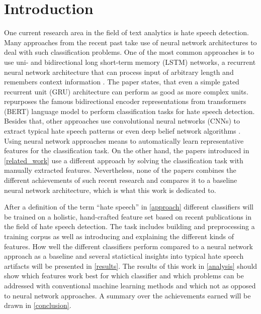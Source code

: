 \section{Introduction}

One current research area in the field of text analytics is hate speech detection. Many approaches from the recent past take use of neural network architectures to deal with such classification problems. One of the most common approaches is to use uni- and bidirectional long short-term memory (LSTM) networks, a recurrent neural network architecture that can process input of arbitrary length and remembers context information \cite{Dorris2020, Syam2019, Saksesi2018}. The paper \cite{Founta2019} states, that even a simple gated recurrent unit (GRU) architecture can perform as good as more complex units. \cite{Saleh2020} repurposes the famous bidirectional encoder representations from transformers (BERT) language model to perform clas\-si\-fi\-ca\-tion tasks for hate speech detection. Besides that, other approaches use con\-vo\-lu\-tional neural networks (CNNs) to extract typical hate speech patterns \cite{Badjatiya2017, Roy2020, Kapil2020} or even deep belief network algorithms \cite{Muhammad2020}. Using neural network approaches means to automatically learn representative features for the classification task. On the other hand, the papers introduced in \autoref{related_work} use a different approach by solving the classification task with manually extracted features. Nevertheless, none of the papers combines the different achievements of such recent research and compares it to a baseline neural network architecture, which is what this work is dedicated to.

After a definition of the term \enquote{hate speech} in \autoref{approach} different classifiers will be trained on a holistic, hand-crafted feature set based on recent pub\-li\-ca\-tions in the field of hate speech detection. The task includes building and pre\-pro\-cess\-ing a training corpus as well as introducing and explaining the different kinds of features. How well the different classifiers perform compared to a neural network approach as a baseline and several statictical insights into typical hate speech artifacts will be presented in \autoref{results}. The results of this work in \autoref{analysis} should show which features work best for which classifier and which problems can be addressed with conventional machine learning methods and which not as opposed to neural network approaches. A summary over the achievements earned will be drawn in \autoref{conclusion}.